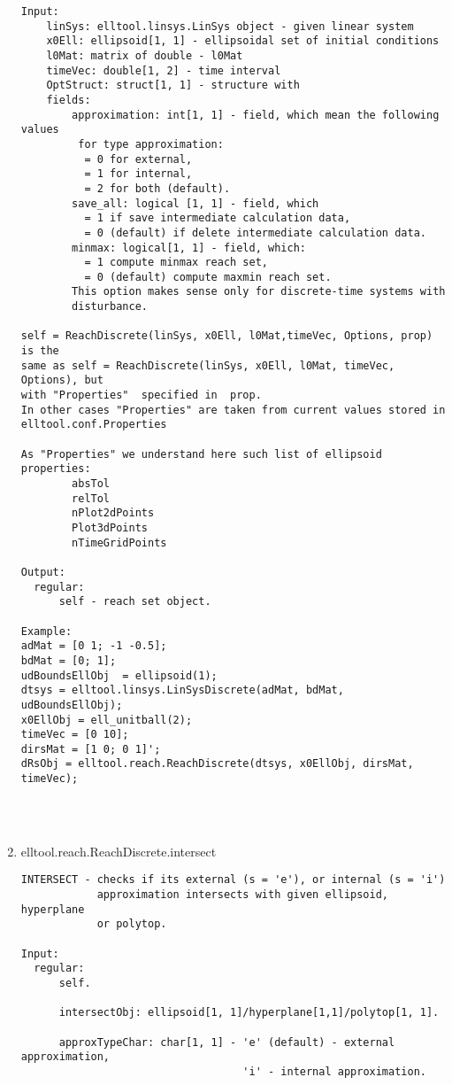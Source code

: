 \begin{enumerate}
\begin{lstlisting}
Input:
    linSys: elltool.linsys.LinSys object - given linear system
    x0Ell: ellipsoid[1, 1] - ellipsoidal set of initial conditions
    l0Mat: matrix of double - l0Mat
    timeVec: double[1, 2] - time interval
    OptStruct: struct[1, 1] - structure with
    fields:
        approximation: int[1, 1] - field, which mean the following values
         for type approximation:
          = 0 for external,
          = 1 for internal,
          = 2 for both (default).
        save_all: logical [1, 1] - field, which
          = 1 if save intermediate calculation data,
          = 0 (default) if delete intermediate calculation data.
        minmax: logical[1, 1] - field, which:
          = 1 compute minmax reach set,
          = 0 (default) compute maxmin reach set.
        This option makes sense only for discrete-time systems with
        disturbance.

self = ReachDiscrete(linSys, x0Ell, l0Mat,timeVec, Options, prop) is the
same as self = ReachDiscrete(linSys, x0Ell, l0Mat, timeVec, Options), but
with "Properties"  specified in  prop.
In other cases "Properties" are taken from current values stored in
elltool.conf.Properties

As "Properties" we understand here such list of ellipsoid properties:
        absTol
        relTol
        nPlot2dPoints
        Plot3dPoints
        nTimeGridPoints

Output:
  regular:
      self - reach set object.

Example:
adMat = [0 1; -1 -0.5];
bdMat = [0; 1];
udBoundsEllObj  = ellipsoid(1);
dtsys = elltool.linsys.LinSysDiscrete(adMat, bdMat, udBoundsEllObj);
x0EllObj = ell_unitball(2);
timeVec = [0 10];
dirsMat = [1 0; 0 1]';
dRsObj = elltool.reach.ReachDiscrete(dtsys, x0EllObj, dirsMat, timeVec);




\end{lstlisting}
\fontfamily{\familydefault}
\selectfont
\item {elltool.reach.ReachDiscrete.intersect}
\selectfont
\begin{lstlisting}
INTERSECT - checks if its external (s = 'e'), or internal (s = 'i')
            approximation intersects with given ellipsoid, hyperplane
            or polytop.

Input:
  regular:
      self.

      intersectObj: ellipsoid[1, 1]/hyperplane[1,1]/polytop[1, 1].

      approxTypeChar: char[1, 1] - 'e' (default) - external approximation,
                                   'i' - internal approximation.


\end{lstlisting}
\end{enumerate}
